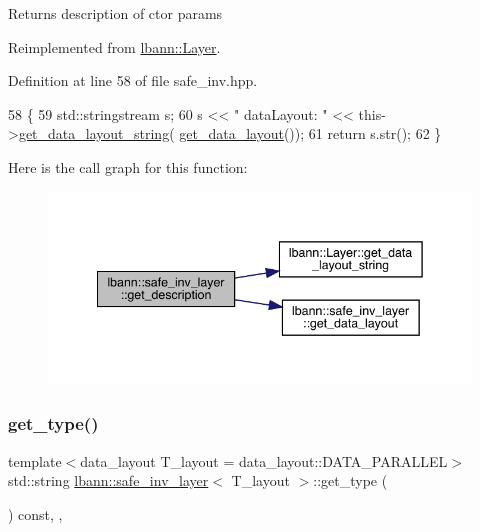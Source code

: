 Returns description of ctor params 

Reimplemented from \hyperlink{classlbann_1_1Layer_acc0803d3428914ca1eb5988c4309174a}{lbann\+::\+Layer}.



Definition at line 58 of file safe\+\_\+inv.\+hpp.


\begin{DoxyCode}
58                                              \{
59     std::stringstream s;
60      s << \textcolor{stringliteral}{" dataLayout: "} << this->\hyperlink{classlbann_1_1Layer_ae3f4a5602df821f4221614b1e3782dc1}{get\_data\_layout\_string}(
      \hyperlink{classlbann_1_1safe__inv__layer_aa82e763a902004d7b0f05b390c3bd45f}{get\_data\_layout}());
61      \textcolor{keywordflow}{return} s.str();
62   \}
\end{DoxyCode}
Here is the call graph for this function\+:\nopagebreak
\begin{figure}[H]
\begin{center}
\leavevmode
\includegraphics[width=342pt]{classlbann_1_1safe__inv__layer_a1823f1ac48228eec1fa0c1578b2b1ab3_cgraph}
\end{center}
\end{figure}
\mbox{\label{classlbann_1_1safe__inv__layer_a6ee075564c6b683a42fc77b16638a588}} 
\subsubsection{\texorpdfstring{get\+\_\+type()}{get\_type()}}
{\footnotesize\ttfamily template$<$data\+\_\+layout T\+\_\+layout = data\+\_\+layout\+::\+D\+A\+T\+A\+\_\+\+P\+A\+R\+A\+L\+L\+EL$>$ \\
std\+::string \hyperlink{classlbann_1_1safe__inv__layer}{lbann\+::safe\+\_\+inv\+\_\+layer}$<$ T\+\_\+layout $>$\+::get\+\_\+type (\begin{DoxyParamCaption}{ }\end{DoxyParamCaption}) const\hspace{0.3cm}{\ttfamily [inline]}, {\ttfamily [override]}, {\ttfamily [virtual]}}

